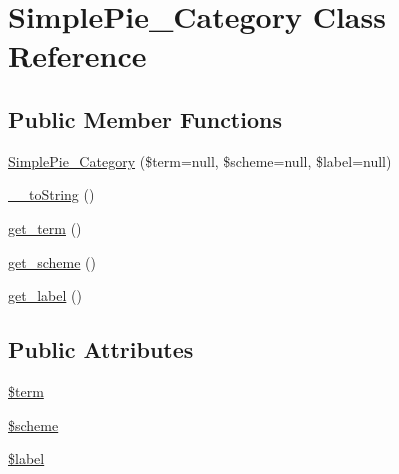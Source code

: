 \hypertarget{class_simple_pie___category}{\section{Simple\-Pie\-\_\-\-Category Class Reference}
\label{class_simple_pie___category}
}
\subsection*{Public Member Functions}
\begin{DoxyCompactItemize}
\item 
\hyperlink{class_simple_pie___category_ab479199cc26531340ccd40931cc39f87}{Simple\-Pie\-\_\-\-Category} (\$term=null, \$scheme=null, \$label=null)
\item 
\hyperlink{class_simple_pie___category_ac351da84a072a5ef08a5d46291d4b337}{\-\_\-\-\_\-to\-String} ()
\item 
\hyperlink{class_simple_pie___category_a090545d5cf3c9c64d8c1fec0c20b659b}{get\-\_\-term} ()
\item 
\hyperlink{class_simple_pie___category_a160d0ca32023ef5fc8a4bf49f975a1d5}{get\-\_\-scheme} ()
\item 
\hyperlink{class_simple_pie___category_af126b5af82c506b1f79c737c4727d40e}{get\-\_\-label} ()
\end{DoxyCompactItemize}
\subsection*{Public Attributes}
\begin{DoxyCompactItemize}
\item 
\hyperlink{class_simple_pie___category_a1330227b65d4cc7bf22a88aa1f668efb}{\$term}
\item 
\hyperlink{class_simple_pie___category_a4e9046a55e48f41ab153ed3ec8f8e720}{\$scheme}
\item 
\hyperlink{class_simple_pie___category_ad7098c9be4a2257c2e9fda0dd615c64a}{\$label}
\end{DoxyCompactItemize}


